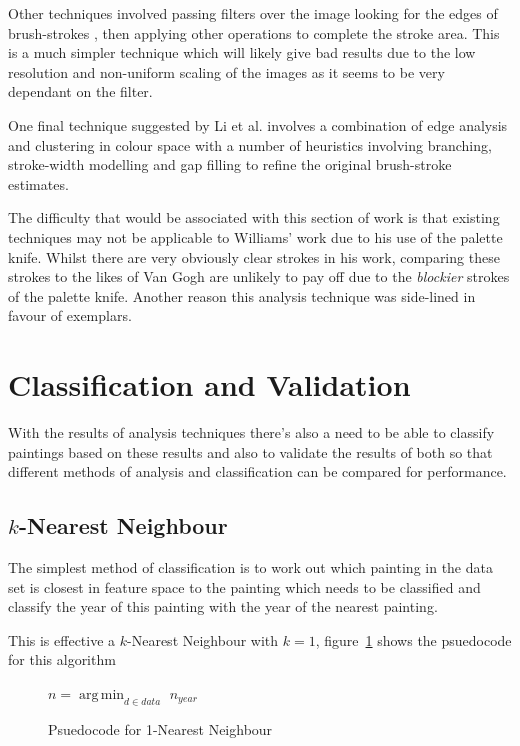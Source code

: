 Other techniques involved passing filters over the image looking for the edges of brush-strokes
\cite{Berezhnoy2009Automatic}, then applying other operations to complete the stroke area. This
is a much simpler technique which will likely give bad results due to the low resolution and
non-uniform scaling of the images as it seems to be very dependant on the filter.

One final technique suggested by Li et al.\cite{Li2012Rhythmic} involves a combination of edge
analysis and clustering in colour space with a number of heuristics involving branching, 
stroke-width modelling and gap filling to refine the original brush-stroke estimates.

The difficulty that would be associated with this section of work is that existing techniques may
not be applicable to Williams' work due to his use of the palette knife. Whilst there are very
obviously clear strokes in his work, comparing these strokes to the likes of Van Gogh are unlikely
to pay off due to the \emph{blockier} strokes of the palette knife. Another reason this analysis
technique was side-lined in favour of exemplars.

\section{Classification and Validation}
With the results of analysis techniques there's also a need to be able to classify paintings based
on these results and also to validate the results of both so that different methods of analysis
and classification can be compared for performance.

\subsection{$k$-Nearest Neighbour}
The simplest method of classification is to work out which painting in the data set is closest in
feature space to the painting which needs to be classified and classify the year of this painting
with the year of the nearest painting.

This is effective a $k$-Nearest Neighbour with $k=1$, figure~\ref{fig:1nn} shows the psuedocode
for this algorithm

\begin{figure}[h]
\begin{algorithmic}
\State $n = \operatorname*{arg\,min}_{d \in data}$ 
\State\Return $n_{year}$
\EndFunction
\end{algorithmic}
\caption{Psuedocode for 1-Nearest Neighbour}\label{fig:1nn}
\end{figure}


